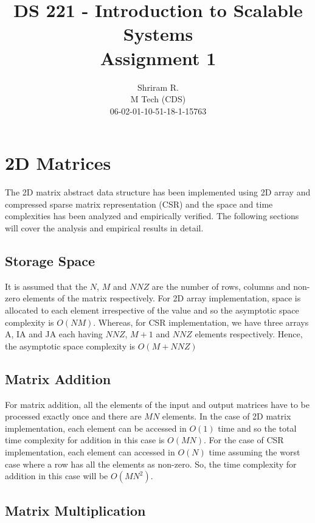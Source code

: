 \documentclass[11pt,a4paper,oneside]{article}
\begin{document}
	\title{DS 221 - Introduction to Scalable Systems \\ Assignment 1}
	\author{Shriram R. \\ M Tech (CDS) \\ 06-02-01-10-51-18-1-15763}
	\maketitle
	
	\section{2D Matrices}
	The 2D matrix abstract data structure has been implemented using 2D array and compressed sparse matrix representation (CSR) and the space and time complexities has been analyzed and empirically verified.
	The following sections will cover the analysis and empirical results in detail.
	
	\subsection{Storage Space}
	It is assumed that the $N$, $M$ and $NNZ$ are the number of rows, columns and non-zero elements of the matrix respectively. For 2D array implementation, space is allocated to each element irrespective of the value and so the asymptotic space complexity is $O(NM)$. Whereas, for CSR implementation, we have three arrays A, IA and JA each having $NNZ$, $M+1$ and $NNZ$ elements respectively. Hence, the asymptotic space complexity is $O(M+NNZ)$ 

    \subsection{Matrix Addition}
    For matrix addition, all the elements of the input and output matrices have to be processed exactly once and there are $MN$ elements. In the case of 2D matrix implementation, each element can be accessed in $O(1)$ time and so the total time complexity for addition in this case is $O(MN)$. For the case of CSR implementation, each element can accessed in $O(N)$ time assuming the worst case where a row has all the elements as non-zero. So, the time complexity for addition in this case will be $O(MN^2)$.
    
    \subsection{Matrix Multiplication}
    
\end{document}
